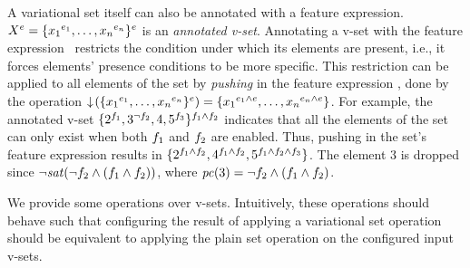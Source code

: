 A variational set itself can also be annotated with a feature expression.
%
$\annot \vset = \setDef {\annot [\dimMeta_1] {\elem_1},\ldots,\annot [\dimMeta_n] {\elem_n}}^\dimMeta$ is an
\emph{annotated v-set}.
Annotating a v-set with the feature expression \dimMeta\ 
restricts the condition under which its elements are present, i.e., it forces
elements' presence conditions to be more specific. This restriction 
can be applied to all elements of the set by \emph{pushing} in the
feature expression \dimMeta, done by the operation
\ensuremath{
\pushIn {\setDef {\annot [\dimMeta_1] {\elem_1},\ldots,\annot [\dimMeta_n] {\elem_n}}^\dimMeta}
= 
\setDef {\annot [\dimMeta_1 \wedge \dimMeta] {\elem_1},\ldots, \annot [\dimMeta_n \wedge \dimMeta] {\elem_n}}
}.
%
For example, the annotated v-set
$\{\annot [\A] 2, \annot [\neg \B] 3, 4, \annot [\C] 5\}^{\A \wedge \B}$
indicates that all the elements of the set can only exist
when both $\A$ and $\B$ are enabled. Thus, pushing in the set's feature expression
results in
$\{\annot [\A \wedge \B] 2,\annot [\A \wedge \B] 4,\annot [\A \wedge \B \wedge \C] 5\}$. The element $3$ is dropped 
since 
\ensuremath{\neg \sat {\neg \B \wedge (\A \wedge \B)}},
where
\ensuremath{
\getPC 3 = \neg \B \wedge (\A \wedge \B)}.

We provide some operations over v-sets. Intuitively, these operations should 
behave such that configuring the result of applying a variational set operation
should be equivalent to applying the plain set operation on the configured 
input v-sets. 
 

